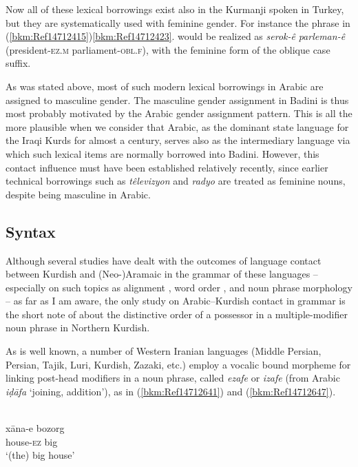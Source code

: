 \documentclass[output=paper]{langsci/langscibook}
\begin{document}
Now all of these lexical borrowings exist also in the Kurmanji spoken in Turkey, but they are systematically used with feminine gender. For instance the phrase in (\ref{bkm:Ref14712415})\ref{bkm:Ref14712423}. would be realized as \textit{serok-ê} \textit{parleman-ê} (president-\textsc{ez.m} parliament-\textsc{obl.f}), with the feminine form of the oblique case suffix. 

As was stated above, most of such modern lexical borrowings in Arabic are assigned to masculine gender. The masculine gender assignment in Badini is thus most probably motivated by the Arabic gender assignment pattern. This is all the more plausible when we consider that Arabic, as the dominant state language for the Iraqi Kurds for almost a century, serves also as the intermediary language via which such lexical items are normally borrowed into Badini. However, this contact influence must have been established relatively recently, since earlier technical borrowings such as \textit{têlevizyon} and \textit{radyo} are treated as feminine nouns, despite being masculine in Arabic.  

\subsection{\label{bkm:Ref520275931} Syntax}

Although several studies have dealt with the outcomes of language contact between Kurdish and (Neo-)Aramaic in the grammar of these languages – especially on such topics as alignment \citep{Coghill2016}, word order \citep{Haig2014}, and noun phrase morphology \citep{Noorlander2014} – as far as I am aware, the only study on Arabic–Kurdish contact in grammar is the short note of \citet{Tsabolov1994} about the distinctive order of a possessor in a multiple-modifier noun phrase in Northern Kurdish. 

As is well known, a number of Western Iranian languages (Middle Persian, Persian, Tajik, Luri, Kurdish, Zazaki, etc.) employ a vocalic bound morpheme for linking post-head modifiers in a noun phrase, called \textit{ezafe} or \textit{izafe} (from Arabic \textit{iḍāfa} ‘joining, addition’), as in (\ref{bkm:Ref14712641}) and (\ref{bkm:Ref14712647}). 

\ea{}\\
\gll xāna-e bozorg\\
     house-\textsc{ez} big\\
\glt ‘(the) big house’
\z
\end{document}
